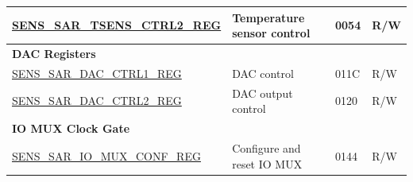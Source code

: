 \begin{longtable}{ | p{6cm} | p{7.2cm} | p{1.3cm} | p{1cm} | }
\hyperref[regdesc:SENSSARTSENSCTRL2REG]{SENS\_SAR\_TSENS\_CTRL2\_REG} & Temperature sensor control & \hexprefix{}0054 & R/W \\ \hline
\multicolumn{4}{|l|}{\textbf{DAC Registers}} \\ \hline
\hyperref[regdesc:SENSSARDACCTRL1REG]{SENS\_SAR\_DAC\_CTRL1\_REG} & DAC control & \hexprefix{}011C & R/W \\ \hline
\hyperref[regdesc:SENSSARDACCTRL2REG]{SENS\_SAR\_DAC\_CTRL2\_REG} & DAC output control & \hexprefix{}0120 & R/W \\ \hline
\multicolumn{4}{|l|}{\textbf{IO MUX Clock Gate}} \\ \hline
\hyperref[regdesc:SENSSARIOMUXCONFREG]{SENS\_SAR\_IO\_MUX\_CONF\_REG} & Configure and reset IO MUX & \hexprefix{}0144 & R/W \\ \hline
\end{longtable}
